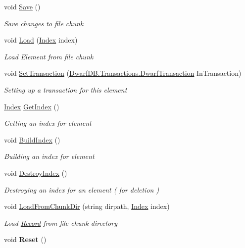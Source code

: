 \begin{DoxyCompactItemize}
\item 
void \hyperlink{class_dwarf_d_b_1_1_data_structures_1_1_record_a01889e57146fd3882228b09d2d54d51c}{Save} ()
\begin{DoxyCompactList}\small\item\em Save changes to file chunk \end{DoxyCompactList}\item 
void \hyperlink{class_dwarf_d_b_1_1_data_structures_1_1_record_aba01a54cf8111326625980fd9b1d4d92}{Load} (\hyperlink{class_dwarf_d_b_1_1_data_structures_1_1_index}{Index} index)
\begin{DoxyCompactList}\small\item\em Load Element from file chunk \end{DoxyCompactList}\item 
void \hyperlink{class_dwarf_d_b_1_1_data_structures_1_1_record_a4997c638afaaa5b8f281a492b639dfca}{Set\+Transaction} (\hyperlink{class_dwarf_d_b_1_1_transactions_1_1_dwarf_transaction}{Dwarf\+D\+B.\+Transactions.\+Dwarf\+Transaction} In\+Transaction)
\begin{DoxyCompactList}\small\item\em Setting up a transaction for this element \end{DoxyCompactList}\item 
\hyperlink{class_dwarf_d_b_1_1_data_structures_1_1_index}{Index} \hyperlink{class_dwarf_d_b_1_1_data_structures_1_1_record_abf7b1ed28e2f443a17f7658222b59c8f}{Get\+Index} ()
\begin{DoxyCompactList}\small\item\em Getting an index for element \end{DoxyCompactList}\item 
void \hyperlink{class_dwarf_d_b_1_1_data_structures_1_1_record_ab4ae005ad5474eb98a8aa45d7f8dd195}{Build\+Index} ()
\begin{DoxyCompactList}\small\item\em Building an index for element \end{DoxyCompactList}\item 
void \hyperlink{class_dwarf_d_b_1_1_data_structures_1_1_record_a6548196371053293f6333d4c29fd5f0d}{Destroy\+Index} ()
\begin{DoxyCompactList}\small\item\em Destroying an index for an element ( for deletion ) \end{DoxyCompactList}\item 
void \hyperlink{class_dwarf_d_b_1_1_data_structures_1_1_record_a81ac5ba44d5682bfba61592af0195cd0}{Load\+From\+Chunk\+Dir} (string dirpath, \hyperlink{class_dwarf_d_b_1_1_data_structures_1_1_index}{Index} index)
\begin{DoxyCompactList}\small\item\em Load \hyperlink{class_dwarf_d_b_1_1_data_structures_1_1_record}{Record} from file chunk directory \end{DoxyCompactList}\item 
\hypertarget{class_dwarf_d_b_1_1_data_structures_1_1_record_aefa85cab909d8d9b60aeabbb23bbc5c7}{void {\bfseries Reset} ()}\label{class_dwarf_d_b_1_1_data_structures_1_1_record_aefa85cab909d8d9b60aeabbb23bbc5c7}


\end{DoxyCompactItemize}
